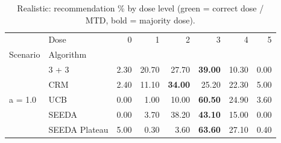 \begin{table}[H]
\centering
\caption{Realistic: recommendation \% by dose level (green = correct dose / MTD, bold = majority dose).}
\label{tab:real_rec_by_dose}
\begin{tabular}{llrrrrrr}
\toprule
 & Dose & 0 & 1 & 2 & 3 & 4 & 5 \\
Scenario & Algorithm &  &  &  &  &  &  \\
\midrule
\multirow[c]{5}{*}{a = 1.0} & 3 + 3 & 2.30 & 20.70 & {\cellcolor[HTML]{C8E6C9}} 27.70 & \bfseries 39.00 & 10.30 & 0.00 \\
 & CRM & 2.40 & 11.10 & {\cellcolor[HTML]{C8E6C9}} \bfseries 34.00 & 25.20 & 22.30 & 5.00 \\
 & UCB & 0.00 & 1.00 & {\cellcolor[HTML]{C8E6C9}} 10.00 & \bfseries 60.50 & 24.90 & 3.60 \\
 & SEEDA & 0.00 & 3.70 & {\cellcolor[HTML]{C8E6C9}} 38.20 & \bfseries 43.10 & 15.00 & 0.00 \\
 & SEEDA Plateau & 5.00 & 0.30 & {\cellcolor[HTML]{C8E6C9}} 3.60 & \bfseries 63.60 & 27.10 & 0.40 \\
\bottomrule
\end{tabular}
\end{table}
